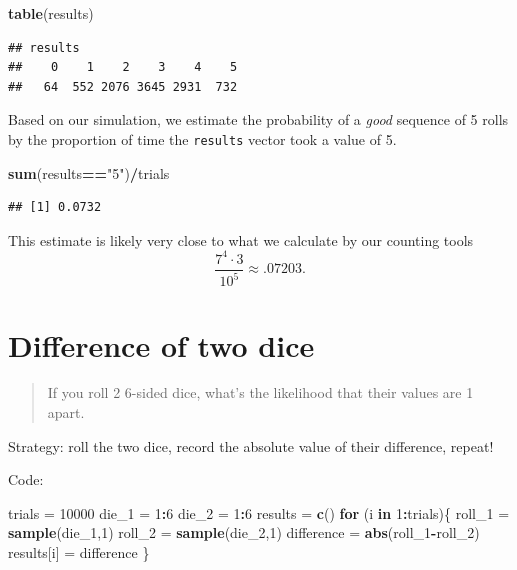 \documentclass[
]{book}
\newenvironment{Shaded}{\begin{snugshade}}{\end{snugshade}}
\newcommand{\ControlFlowTok}[1]{\textcolor[rgb]{0.13,0.29,0.53}{\textbf{#1}}}
\newcommand{\DecValTok}[1]{\textcolor[rgb]{0.00,0.00,0.81}{#1}}
\newcommand{\FunctionTok}[1]{\textcolor[rgb]{0.13,0.29,0.53}{\textbf{#1}}}
\newcommand{\NormalTok}[1]{#1}
\newcommand{\OtherTok}[1]{\textcolor[rgb]{0.56,0.35,0.01}{#1}}
\newcommand{\SpecialCharTok}[1]{\textcolor[rgb]{0.81,0.36,0.00}{\textbf{#1}}}
\newcommand{\StringTok}[1]{\textcolor[rgb]{0.31,0.60,0.02}{#1}}
\theoremstyle{definition}
\theoremstyle{definition}
\theoremstyle{definition}
\theoremstyle{definition}
\theoremstyle{remark}
\begin{document}
\begin{Shaded}
\begin{Highlighting}[]
\FunctionTok{table}\NormalTok{(results)}
\end{Highlighting}
\end{Shaded}

\begin{verbatim}
## results
##    0    1    2    3    4    5 
##   64  552 2076 3645 2931  732
\end{verbatim}

Based on our simulation, we estimate the probability of a \emph{good} sequence of 5 rolls by the proportion of time the \texttt{results} vector took a value of 5.

\begin{Shaded}
\begin{Highlighting}[]
\FunctionTok{sum}\NormalTok{(results}\SpecialCharTok{==}\StringTok{"5"}\NormalTok{)}\SpecialCharTok{/}\NormalTok{trials}
\end{Highlighting}
\end{Shaded}

\begin{verbatim}
## [1] 0.0732
\end{verbatim}

This estimate is likely very close to what we calculate by our counting tools \[\frac{7^4\cdot 3}{10^5} \approx .07203.\]

\section{Difference of two dice}\label{diff-2dice-R}

\begin{quote}
If you roll 2 6-sided dice, what's the likelihood that their values are 1 apart.
\end{quote}

Strategy: roll the two dice, record the absolute value of their difference, repeat!

Code:

\begin{Shaded}
\begin{Highlighting}[]
\NormalTok{trials }\OtherTok{=} \DecValTok{10000}
\NormalTok{die\_1 }\OtherTok{=} \DecValTok{1}\SpecialCharTok{:}\DecValTok{6}
\NormalTok{die\_2 }\OtherTok{=} \DecValTok{1}\SpecialCharTok{:}\DecValTok{6}
\NormalTok{results }\OtherTok{=} \FunctionTok{c}\NormalTok{()}
\ControlFlowTok{for}\NormalTok{ (i }\ControlFlowTok{in} \DecValTok{1}\SpecialCharTok{:}\NormalTok{trials)\{}
\NormalTok{  roll\_1 }\OtherTok{=} \FunctionTok{sample}\NormalTok{(die\_1,}\DecValTok{1}\NormalTok{)}
\NormalTok{  roll\_2 }\OtherTok{=} \FunctionTok{sample}\NormalTok{(die\_2,}\DecValTok{1}\NormalTok{)}
\NormalTok{  difference }\OtherTok{=} \FunctionTok{abs}\NormalTok{(roll\_1}\SpecialCharTok{{-}}\NormalTok{roll\_2)}
\NormalTok{  results[i] }\OtherTok{=}\NormalTok{ difference}
\NormalTok{\}}
\end{Highlighting}
\end{Shaded}
\end{document}
